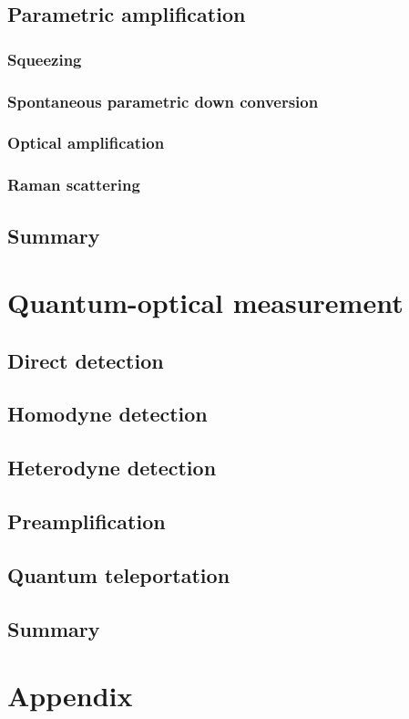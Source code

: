 \documentclass{book}
\begin{document}
\section{Parametric amplification}
\subsection{Squeezing}
\subsection{Spontaneous parametric down conversion}
\subsection{Optical amplification}
\subsection{Raman scattering}
\section{Summary}

\chapter{Quantum-optical measurement}
\section{Direct detection}
\section{Homodyne detection}
\section{Heterodyne detection}
\section{Preamplification}
\section{Quantum teleportation}
\section{Summary}

\appendix
\chapter{Appendix}
\end{document}
